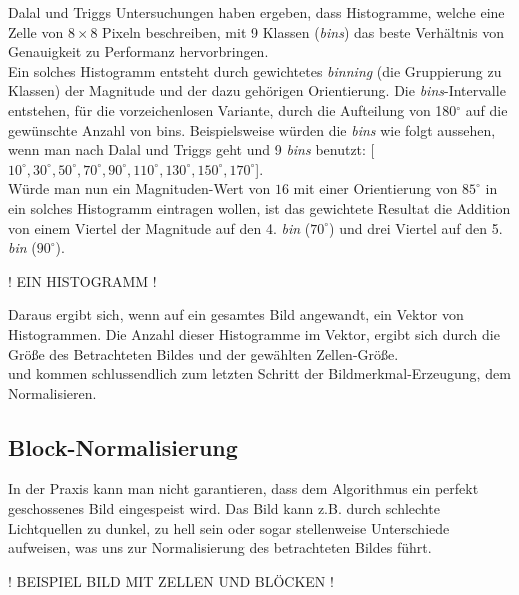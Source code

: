 Dalal und Triggs Untersuchungen haben ergeben, dass Histogramme, welche eine Zelle von $8\times8$ Pixeln beschreiben, mit 9 Klassen (\emph{bins}) das beste Verhältnis von Genauigkeit zu Performanz hervorbringen.\\
Ein solches Histogramm entsteht durch gewichtetes \emph{binning} (die Gruppierung zu Klassen) der Magnitude und der dazu gehörigen Orientierung.
Die \emph{bins}-Intervalle entstehen, für die vorzeichenlosen Variante, durch die Aufteilung von 180$^\circ$ auf die gewünschte Anzahl von bins.
Beispielsweise würden die \emph{bins} wie folgt aussehen, wenn man nach Dalal und Triggs geht und 9 \emph{bins} benutzt: 
[$10^\circ,30^\circ,50^\circ,70^\circ,90^\circ,110^\circ,130^\circ,150^\circ,170^\circ$].\\
Würde man nun ein Magnituden-Wert von $16$ mit einer Orientierung von $85^\circ$ in ein solches Histogramm eintragen wollen, ist das gewichtete Resultat die Addition von einem Viertel der Magnitude auf den 4. \emph{bin} ($70^\circ$) und drei Viertel auf den 5. \emph{bin} ($90^\circ$).

\vspace*{5 mm}
! EIN HISTOGRAMM !
\vspace*{5 mm}

Daraus ergibt sich, wenn auf ein gesamtes Bild angewandt, ein Vektor von Histogrammen. Die Anzahl dieser Histogramme im Vektor, ergibt sich durch die Größe des Betrachteten Bildes und der gewählten Zellen-Größe.\\
und kommen schlussendlich zum letzten Schritt der Bildmerkmal-Erzeugung, dem Normalisieren.

\subsection{Block-Normalisierung}

In der Praxis kann man nicht garantieren, dass dem Algorithmus ein perfekt geschossenes Bild eingespeist wird. Das Bild kann z.B. durch schlechte Lichtquellen zu dunkel, zu hell sein oder sogar stellenweise Unterschiede aufweisen, was uns zur Normalisierung des betrachteten Bildes führt.

\vspace{5 mm}
! BEISPIEL BILD MIT ZELLEN UND BLÖCKEN !
\vspace{5 mm}

